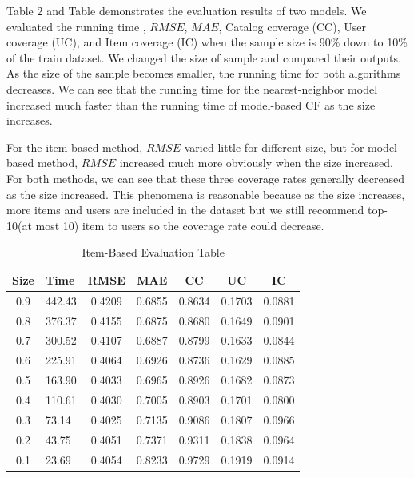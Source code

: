 \documentclass[12pt,journal,compsoc]{IEEEtran}
\begin{document}
Table 2 and Table demonstrates the evaluation results of two models. We evaluated the running time , $RMSE$, $MAE$, Catalog coverage (CC), User coverage (UC), and Item coverage (IC) when the sample size is 90\% down to 10\% of the train dataset. We changed the size of sample and compared their outputs. As the size of the sample becomes smaller, the running time for both algorithms decreases. We can see that the running time for the nearest-neighbor model increased much faster than the running time of model-based CF as the size increases.

For the item-based method, $RMSE$ varied little for different size, but for model-based method, $RMSE$ increased much more obviously when the size increased. For both methods, we can see that these three coverage rates generally decreased as the size increased. This phenomena is reasonable because as the size increases, more items and users are included in the dataset but we still recommend top-10(at most 10) item to users so the coverage rate could decrease.



\begin{table}[H] 
\centering
\caption{\label{tab_est:1} Item-Based Evaluation Table}
\label{my-label}
\begin{tabular}{c|lccccc}
\hline \hline
Size	    & Time	& RMSE	    & MAE	    & CC	    & UC	    & IC     \\ \hline
0.9         & 442.43	& 0.4209	& 0.6855	& 0.8634	& 0.1703	& 0.0881 \\ \hline
0.8	        & 376.37	& 0.4155	& 0.6875	& 0.8680	& 0.1649	& 0.0901 \\ \hline
0.7	        & 300.52	& 0.4107	& 0.6887	& 0.8799	& 0.1633	& 0.0844 \\ \hline
0.6	        & 225.91	& 0.4064	& 0.6926	& 0.8736	& 0.1629	& 0.0885 \\ \hline
0.5	        & 163.90	& 0.4033	& 0.6965	& 0.8926	& 0.1682	& 0.0873 \\ \hline
0.4	        & 110.61	& 0.4030	& 0.7005	& 0.8903	& 0.1701	& 0.0800 \\ \hline
0.3	        & 73.14	    & 0.4025	& 0.7135	& 0.9086	& 0.1807	& 0.0966 \\ \hline
0.2	        & 43.75	    & 0.4051	& 0.7371	& 0.9311	& 0.1838	& 0.0964 \\ \hline
0.1	        & 23.69	    & 0.4054	& 0.8233	& 0.9729	& 0.1919	& 0.0914 \\ \hline
\hline
\end{tabular}
\end{table}
\end{document}
